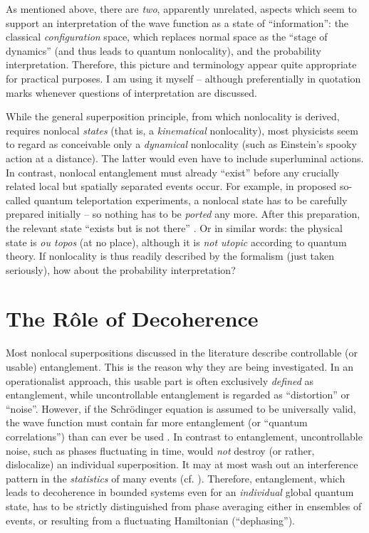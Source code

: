 \documentclass[12pt]{article}
\newcommand{\ts}{\hspace{3pt}}
\begin{document}
As mentioned above, there are {\it two}, apparently unrelated, aspects
which seem to support an interpretation of the wave function as a state
of ``information'': the classical {\it configuration} space, which
replaces normal space as the  ``stage of dynamics'' (and
thus leads to quantum nonlocality), and the probability interpretation.
Therefore, this picture and terminology appear quite appropriate for
practical purposes.  I am using it myself -- although preferentially
in quotation marks whenever questions of interpretation are discussed.

While the general superposition principle, from which nonlocality
is derived, requires nonlocal {\it states} (that is, a {\it
kinematical} nonlocality), most physicists seem to regard as
conceivable only a {\it dynamical} nonlocality (such as Einstein's
spooky action at a distance). The latter would even have to include
superluminal actions. In contrast, nonlocal entanglement must already
``exist'' before any crucially related local but spatially separated
events occur. For example, in proposed so-called quantum teleportation
experiments, a nonlocal state has to be carefully prepared initially
-- so nothing has to be {\it ported} any more. After this preparation,
the relevant state ``exists but is not there'' \cite{JZ}. Or in similar
words: the physical state is {\it ou topos} (at no place), although it
is {\it not utopic} according to quantum theory. If nonlocality is thus
readily described by the formalism (just taken
seriously), how about the probability interpretation?

\section{The R\^ole of Decoherence}
Most nonlocal superpositions discussed in the literature
describe controllable (or usable) entanglement. This is the reason why
they are being investigated. In an operationalist approach, this
usable part is often exclusively {\it defined} as entanglement, while
uncontrollable entanglement is regarded as  ``distortion'' or
``noise''. However, if the Schr\"odinger equation is assumed to be
universally valid, the wave function must contain far more
entanglement (or ``quantum correlations'') than can ever be used
\cite{Z1970}. In contrast to entanglement, uncontrollable noise, such
as phases fluctuating in time, would {\it not} destroy (or rather,
dislocalize) an individual superposition. It may at most wash out an
interference pattern in the {\it statistics} of many events (cf.\ts
\cite{Giulini}). Therefore, entanglement, which leads to decoherence
in bounded systems even for an {\it individual} global quantum state,
has to be strictly distinguished from phase averaging either in
ensembles of events, or resulting from a fluctuating Hamiltonian
(``dephasing'').
\end{document}
